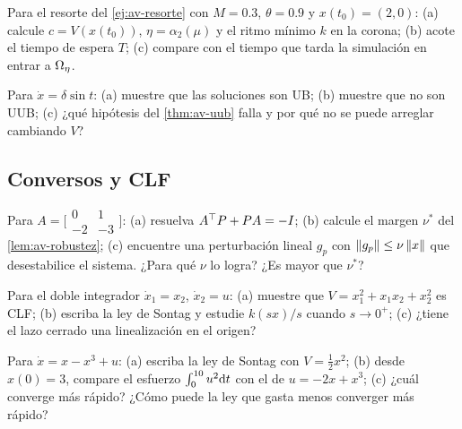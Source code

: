 \begin{problema}\label{prob:av-esperaresorte}
Para el resorte del \cref{ej:av-resorte} con $M=0.3$, $\theta=0.9$ y $x(t_0)=(2,0)$: (a) calcule $c=V(x(t_0))$, $\eta=\alpha_2(\mu)$ y el ritmo mínimo $k$ en la corona; (b) acote el tiempo de espera $T$; (c) \etiquetaM{} compare con el tiempo que tarda la simulación en entrar a $\Omega_{\eta}$.
\end{problema}

\begin{problema}\label{prob:av-integrador}
Para $\dot x=\delta\sin t$: (a) muestre que las soluciones son UB; (b) muestre que no son UUB; (c) ¿qué hipótesis del \cref{thm:av-uub} falla y por qué no se puede arreglar cambiando $V$?
\end{problema}

\subsection*{Conversos y CLF}

\begin{problema}\label{prob:av-margen}
Para $A=\bigl[\begin{smallmatrix}0&1\\-2&-3\end{smallmatrix}\bigr]$: (a) resuelva $A^{\top} P+PA=-I$; (b) calcule el margen $\nu^*$ del \cref{lem:av-robustez}; (c) encuentre una perturbación lineal $g_p$ con $\left\lVert g_p\right\rVert\le\nu\left\lVert x\right\rVert$ que desestabilice el sistema. ¿Para qué $\nu$ lo logra? ¿Es mayor que $\nu^*$?
\end{problema}

\begin{problema}[arreglar la $V$]\label{prob:av-dobleintegrador}
Para el doble integrador $\dot x_1=x_2$, $\dot x_2=u$: (a) muestre que $V=x_1^2+x_1x_2+x_2^2$ es CLF; (b) escriba la ley de Sontag y estudie $k(sx)/s$ cuando $s\to0^+$; (c) ¿tiene el lazo cerrado una linealización en el origen?
\end{problema}

\begin{problema}\label{prob:av-conservar}
Para $\dot x=x-x^3+u$: (a) escriba la ley de Sontag con $V=\tfrac12x^2$; (b) \etiquetaM{} desde $x(0)=3$, compare el esfuerzo $\int_0^{10}u^2\mathrm{d} t$ con el de $u=-2x+x^3$; (c) ¿cuál converge más rápido? ¿Cómo puede la ley que gasta menos converger más rápido?
\end{problema}

